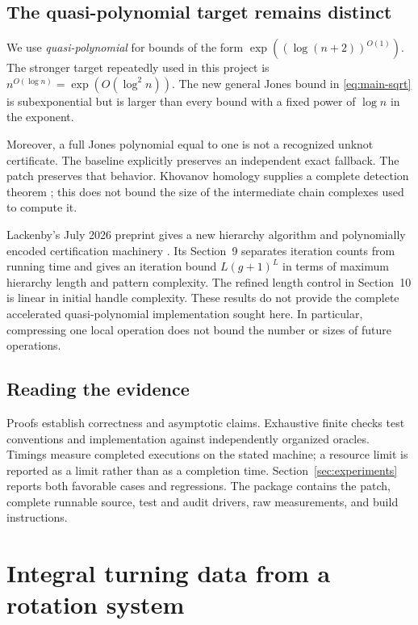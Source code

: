 \documentclass[11pt]{article}
\theoremstyle{definition}
\theoremstyle{remark}
\begin{document}
\subsection{The quasi-polynomial target remains distinct}

We use \emph{quasi-polynomial} for bounds of the form
$\exp((\log(n+2))^{O(1)})$. The stronger target repeatedly used in this
project is $n^{O(\log n)}=\exp(O(\log^2 n))$.
The new general Jones bound in \eqref{eq:main-sqrt} is subexponential but is
larger than every bound with a fixed power of $\log n$ in the exponent.

Moreover, a full Jones polynomial equal to one is not a recognized unknot
certificate. The baseline explicitly preserves an independent exact
fallback. The patch preserves that behavior. Khovanov homology supplies a
complete detection theorem \cite{kronheimer-mrowka}; this does not bound the
size of the intermediate chain complexes used to compute it.

Lackenby's July 2026 preprint gives a new hierarchy algorithm and
polynomially encoded certification machinery \cite{lackenby2026}. Its
Section~9 separates iteration counts from running time and gives an
iteration bound $L(g+1)^L$ in terms of maximum hierarchy length and pattern
complexity. The refined length control in Section~10 is linear in initial
handle complexity. These results do not provide the complete accelerated
quasi-polynomial implementation sought here. In particular, compressing one
local operation does not bound the number or sizes of future operations.

\subsection{Reading the evidence}

Proofs establish correctness and asymptotic claims. Exhaustive finite
checks test conventions and implementation against independently organized
oracles. Timings measure completed executions on the stated machine; a
resource limit is reported as a limit rather than as a completion time.
Section~\ref{sec:experiments} reports both favorable cases and regressions.
The package contains the patch, complete runnable source, test and audit
drivers, raw measurements, and build instructions.

\section{Integral turning data from a rotation system}
\label{sec:turning}
\end{document}
